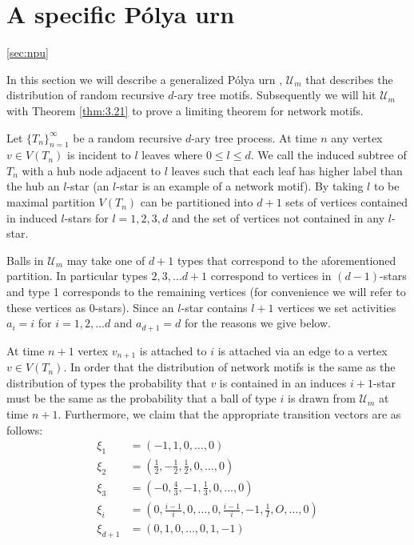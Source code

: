 \documentclass[oneside]{book} %
\theoremstyle{definition}
\numberwithin{equation}{section}
\begin{document}
\section{A specific P\'{o}lya urn}\ref{sec:npu}

In this section we will describe a generalized P\'{o}lya urn , $\mathcal{U}_m$ that describes the distribution of random recursive $d$-ary tree motifs.  Subsequently we will hit $\mathcal{U}_m$ with Theorem \ref{thm:3.21} to prove a limiting theorem for network motifs.

Let $\{T_n\}_{n=1}^{\infty}$ be a random recursive $d$-ary tree process.  At time $n$ any vertex $v \in V(T_n)$ is incident to $l$ leaves where $0 \leq l \leq d$.  We call the induced subtree of $T_n$ with a hub node adjacent to $l$ leaves such that each leaf has higher label than the hub an $l$-star (an $l$-star is an example of a network motif).  By taking $l$ to be maximal partition $V(T_n)$ can be partitioned into $d+1$ sets of vertices contained in induced $l$-stars for $l=1,2,3, d$ and the set of vertices not contained in any $l$-star.

Balls in $\mathcal{U}_m$  may take one of $d+1$ types that correspond to the aforementioned partition. In particular types $2,3,\dots d+1$ correspond to vertices in $(d-1)$-stars  and type 1 corresponds to the remaining vertices (for convenience we will refer to these vertices as 0-stars).  Since an $l$-star contains $l+1$ vertices we set activities $a_i = i$ for $i = 1,2,\dots d$ and $a_{d+1} = d$ for the reasons we give below.

At time $n+1$ vertex $v_{n+1}$ is attached to $i$ is attached via an edge to a vertex $v\in V(T_n)$.  In order that the distribution of network motifs is the same as the distribution of types the probability that $v$ is contained in an induces $i+1$-star must be the same as the probability that a ball of type $i$ is drawn from $\mathcal{U}_m$ at time $n+1$.  Furthermore, we claim that the appropriate transition vectors are as follows:
\begin{align*}
 \xi_{1} &= (-1,1,0,\dots,0) \\
 \xi_{2} &= (\frac{1}{2},-\frac{1}{2},\frac{1}{2},0,\dots,0) \\
 \xi_{3} &= (-0,\frac{4}{3},-1,\frac{1}{3},0,\dots,0) \\
 \xi_{i} &= (0,\frac{i-1}{i},0,\dots,0, \frac{i-1}{i},-1,\frac{1}{I},O,\dots,0) \\
 \xi_{d+1} &= (0,1,0,\dots,0,1,-1) \\
\end{align*}
\end{document}
